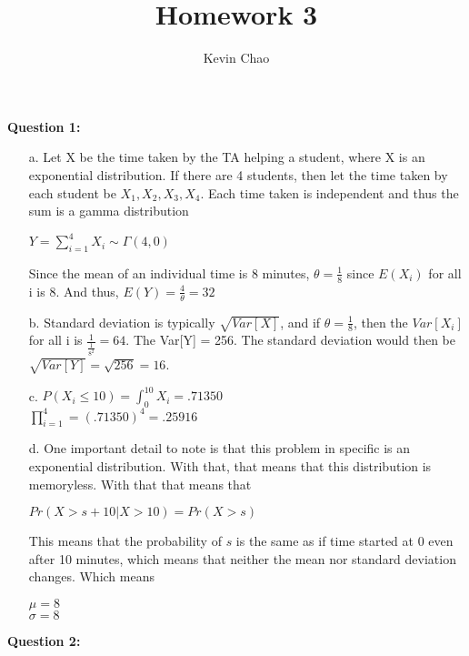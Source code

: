\documentclass{article}
\begin{document}
\title{Homework 3}
\author{Kevin Chao}
\maketitle

\textbf{Question 1:}
\begin{enumerate}
	\item[a.] Let X be the time taken by the TA helping a student, where X is an exponential distribution. If there are 4 students, then let the time taken by each student be $X_{1}, X_{2}, X_{3},X_{4}. $ Each time taken is independent and thus the sum is a gamma distribution
	\begin{center}
		$Y = \sum_{i=1}^{4}X_{i} \sim  \Gamma (4,0)$ 
	\end{center}
	Since the mean of an individual time is 8 minutes, $\theta = \frac{1}{8}$ since $E(X_{i})$ for all i is 8. And thus, $E(Y) = \frac{4}{\theta} = 32$
	
	\item[b.] Standard deviation is typically $\sqrt{Var[X]}$, and if $\theta = \frac{1}{8}$,  then the $Var[X_{i}]$ for all i is $\displaystyle \frac{1}{\displaystyle \frac{1}{8^2}} = 64$. The Var[Y]
	= 256. The standard deviation would then be $\sqrt{Var[Y]} = \sqrt{256} = 16$.
	
	\item[c.] $P(X_{i} \leq 10) = \int_{0}^{10}X_{i} = .71350$ \\
		$\prod_{i=1}^{4} = (.71350)^4 = .25916$
	
	\item[d.] One important detail to note is that this problem in specific is an exponential distribution. With that, that means that this distribution is memoryless. With that that means that
		\begin{center}
			$Pr(X > s + 10 | X > 10) = Pr(X > s)$
		\end{center}
		This means that the probability of $s$ is the same as if time started at 0 even after 10 minutes, which means that neither the mean nor standard deviation changes. Which means 
		\begin{center}
			$\mu = 8 $ \\
			$\sigma = 8$
		\end{center}
\end{enumerate}
\textbf{Question 2:}
\end{document}

